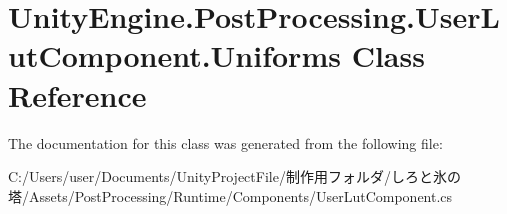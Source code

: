 \hypertarget{class_unity_engine_1_1_post_processing_1_1_user_lut_component_1_1_uniforms}{}\section{Unity\+Engine.\+Post\+Processing.\+User\+Lut\+Component.\+Uniforms Class Reference}
\label{class_unity_engine_1_1_post_processing_1_1_user_lut_component_1_1_uniforms}


The documentation for this class was generated from the following file\+:\begin{DoxyCompactItemize}
\item 
C\+:/\+Users/user/\+Documents/\+Unity\+Project\+File/制作用フォルダ/しろと氷の塔/\+Assets/\+Post\+Processing/\+Runtime/\+Components/User\+Lut\+Component.\+cs\end{DoxyCompactItemize}
